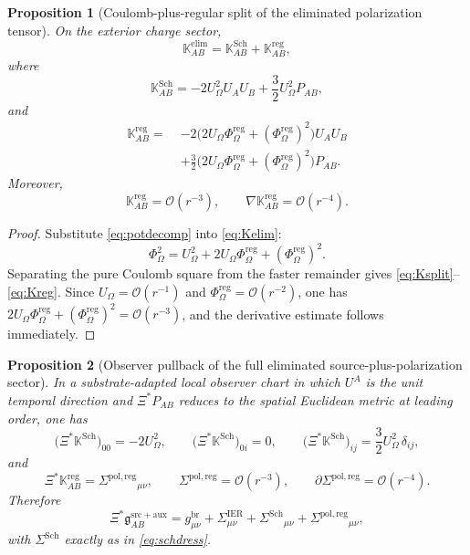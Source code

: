 \documentclass[11pt]{article}
\newcommand{\BridgeMetric}{\mathfrak g}
\newcommand{\ObserverMap}{\Xi}
\newcommand{\ProjSub}{P}
\newcommand{\FlowPot}{\Phi_\Omega}
\newcommand{\FlowPotReg}{\Phi_\Omega^{\mathrm{reg}}}
\newcommand{\CoulPot}{U_\Omega}
\newcommand{\SigmaIER}{\Sigma^{\mathrm{IER}}}
\newcommand{\SigmaDressSch}{\Sigma^{\mathrm{Sch}}}
\newcommand{\SigmaRegPol}{\Sigma^{\mathrm{pol,reg}}}
\newcommand{\AuxPol}{\mathbb K}
\newtheorem{proposition}{Proposition}
\begin{document}
\begin{proposition}[Coulomb-plus-regular split of the eliminated polarization tensor]
\label{prop:split}
On the exterior charge sector,
\begin{equation}
\AuxPol_{AB}^{\mathrm{elim}}
=
\AuxPol_{AB}^{\mathrm{Sch}}
+\AuxPol_{AB}^{\mathrm{reg}},
\label{eq:Ksplit}
\end{equation}
where
\begin{equation}
\AuxPol_{AB}^{\mathrm{Sch}}
=
-2\CoulPot^2U_AU_B
+\frac32\CoulPot^2\ProjSub_{AB},
\label{eq:Ksch}
\end{equation}
and
\begin{align}
\AuxPol_{AB}^{\mathrm{reg}}
=\;&
-2\bigl(2\CoulPot\FlowPotReg+(\FlowPotReg)^2\bigr)U_AU_B
\nonumber\\
&+\frac32\bigl(2\CoulPot\FlowPotReg+(\FlowPotReg)^2\bigr)\ProjSub_{AB}.
\label{eq:Kreg}
\end{align}
Moreover,
\begin{equation}
\AuxPol_{AB}^{\mathrm{reg}}=\mathcal O(r^{-3}),
\qquad
\nabla\AuxPol_{AB}^{\mathrm{reg}}=\mathcal O(r^{-4}).
\label{eq:Kregdecay}
\end{equation}
\end{proposition}

\begin{proof}
Substitute \eqref{eq:potdecomp} into \eqref{eq:Kelim}:
\[
\FlowPot^2=\CoulPot^2+2\CoulPot\FlowPotReg+(\FlowPotReg)^2.
\]
Separating the pure Coulomb square from the faster remainder gives \eqref{eq:Ksplit}--\eqref{eq:Kreg}. Since \(\CoulPot=\mathcal O(r^{-1})\) and \(\FlowPotReg=\mathcal O(r^{-2})\), one has \(2\CoulPot\FlowPotReg+(\FlowPotReg)^2=\mathcal O(r^{-3})\), and the derivative estimate follows immediately.
\end{proof}

\begin{proposition}[Observer pullback of the full eliminated source-plus-polarization sector]
\label{prop:pullback}
In a substrate-adapted local observer chart in which \(U^A\) is the unit temporal direction and \(\ObserverMap^\ast\ProjSub_{AB}\) reduces to the spatial Euclidean metric at leading order, one has
\begin{equation}
\bigl(\ObserverMap^\ast\AuxPol^{\mathrm{Sch}}\bigr)_{00}
=
-2\CoulPot^2,
\qquad
\bigl(\ObserverMap^\ast\AuxPol^{\mathrm{Sch}}\bigr)_{0i}
=
0,
\qquad
\bigl(\ObserverMap^\ast\AuxPol^{\mathrm{Sch}}\bigr)_{ij}
=
\frac32\CoulPot^2\,\delta_{ij},
\label{eq:pullsch}
\end{equation}
and
\begin{equation}
\ObserverMap^\ast\AuxPol_{AB}^{\mathrm{reg}}
=
\SigmaRegPol{}_{\mu\nu},
\qquad
\SigmaRegPol=\mathcal O(r^{-3}),
\qquad
\partial\SigmaRegPol=\mathcal O(r^{-4}).
\label{eq:pullreg}
\end{equation}
Therefore
\begin{equation}
\ObserverMap^\ast \BridgeMetric_{AB}^{\mathrm{src+aux}}
=
g_{\mu\nu}^{\mathrm{br}}
+\SigmaIER_{\mu\nu}
+\SigmaDressSch{}_{\mu\nu}
+\SigmaRegPol{}_{\mu\nu},
\label{eq:targetrecovered}
\end{equation}
with \(\SigmaDressSch\) exactly as in \eqref{eq:schdress}.
\end{proposition}
\end{document}
